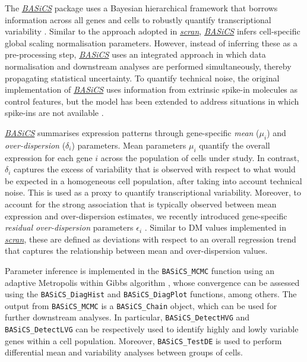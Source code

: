 \documentclass[9pt,a4paper,]{extarticle}
\begin{document}
The \emph{\href{https://bioconductor.org/packages/3.11/BASiCS}{BASiCS}} package uses a Bayesian hierarchical framework
that borrows information across all genes and cells to robustly quantify
transcriptional variability \citep{Vallejos2015BASiCS}.
Similar to the approach adopted in \emph{\href{https://bioconductor.org/packages/3.11/scran}{scran}}, \emph{\href{https://bioconductor.org/packages/3.11/BASiCS}{BASiCS}}
infers cell-specific global scaling normalisation parameters.
However, instead of inferring these as a pre-processing step,
\emph{\href{https://bioconductor.org/packages/3.11/BASiCS}{BASiCS}} uses an integrated approach in which data normalisation
and downstream analyses are performed simultaneously, thereby propagating
statistical uncertainty.
To quantify technical noise, the original implementation of
\emph{\href{https://bioconductor.org/packages/3.11/BASiCS}{BASiCS}} uses information from extrinsic spike-in molecules as
control features, but the model has been extended to address situations in which
spike-ins are not available \citep{Eling2018}.

\emph{\href{https://bioconductor.org/packages/3.11/BASiCS}{BASiCS}} summarises expression patterns through
gene-specific \emph{mean} (\(\mu_i\)) and \emph{over-dispersion} (\(\delta_i\)) parameters.
Mean parameters \(\mu_i\) quantify the overall expression for each gene \(i\)
across the population of cells under study.
In contrast, \(\delta_i\) captures the excess of variability that is observed with
respect to what would be expected in a homogeneous cell population, after
taking into account technical noise.
This is used as a proxy to quantify transcriptional variability.
Moreover, to account for the strong association that is typically observed
between mean expression and over-dispersion estimates, we recently introduced
gene-specific \emph{residual over-dispersion} parameters \(\epsilon_i\) \citep{Eling2018}.
Similar to DM values implemented in \emph{\href{https://bioconductor.org/packages/3.11/scran}{scran}}, these are defined as
deviations with respect to an overall regression trend that captures the
relationship between mean and over-dispersion values.

Parameter inference is implemented in the \texttt{BASiCS\_MCMC} function using an
adaptive Metropolis within Gibbs algorithm \citep{Roberts2009}, whose convergence can
be assessed using the \texttt{BASiCS\_DiagHist} and \texttt{BASiCS\_DiagPlot} functions,
among others.
The output from \texttt{BASiCS\_MCMC} is a \texttt{BASiCS\_Chain} object, which can be used
for further downstream analyses. In particular, \texttt{BASiCS\_DetectHVG} and
\texttt{BASiCS\_DetectLVG} can be respectively used to identify highly and lowly
variable genes within a cell population. Moreover, \texttt{BASiCS\_TestDE} is used to
perform differential mean and variability analyses between groups of cells.
\end{document}
